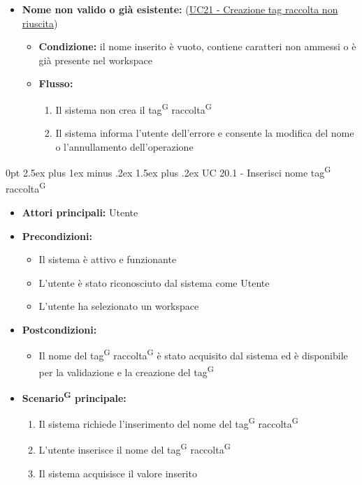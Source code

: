 \documentclass[a4paper, 11pt]{article}
\makeatletter
\renewcommand\paragraph{\@startsection{paragraph}{4}
  {0pt}
  {2.5ex plus 1ex minus .2ex}
  {1.5ex plus .2ex}
  {\normalfont\normalsize\bfseries\color{AccentDark}}}
\makeatother
\begin{document}
\begin{itemize}
    \begin{itemize}
        \item \textbf{Nome non valido o già esistente:} (\hyperref[UC21]{UC21 - Creazione tag raccolta non riuscita})
        \begin{itemize}
            \item \textbf{Condizione:} il nome inserito è vuoto, contiene caratteri non ammessi o è già presente nel workspace
            \item \textbf{Flusso:}
            \begin{enumerate}
                \item Il sistema non crea il tag\textsuperscript{G} raccolta\textsuperscript{G}
                \item Il sistema informa l'utente dell'errore e consente la modifica del nome o l'annullamento dell'operazione
            \end{enumerate}
        \end{itemize}
    \end{itemize}
\end{itemize}

\paragraph{UC 20.1 - Inserisci nome tag\textsuperscript{G} raccolta\textsuperscript{G}} \label{UC20.1}
\begin{itemize}
	\item \textbf{Attori principali:} Utente
	\item \textbf{Precondizioni:}
	\begin{itemize}
		\item Il sistema è attivo e funzionante
		\item L'utente è stato riconosciuto dal sistema come Utente
		\item L'utente ha selezionato un workspace
	\end{itemize}
	\item \textbf{Postcondizioni:}
	\begin{itemize}
		\item Il nome del tag\textsuperscript{G} raccolta\textsuperscript{G} è stato acquisito dal sistema ed è disponibile per la validazione e la creazione del tag\textsuperscript{G}
	\end{itemize}
	\item \textbf{Scenario\textsuperscript{G} principale:}
	\begin{enumerate}
		\item Il sistema richiede l'inserimento del nome del tag\textsuperscript{G} raccolta\textsuperscript{G}
		\item L'utente inserisce il nome del tag\textsuperscript{G} raccolta\textsuperscript{G}
		\item Il sistema acquisisce il valore inserito
	\end{enumerate}
\end{itemize}
\end{document}
